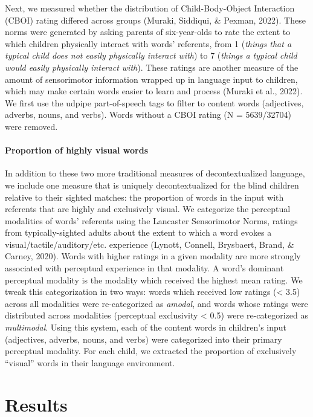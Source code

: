 \documentclass[
  man,floatsintext]{apa6}
\let\oldparagraph\paragraph
\renewcommand{\paragraph}[1]{\oldparagraph{#1}\mbox{}}
\begin{document}
Next, we measured whether the distribution of Child-Body-Object Interaction (CBOI) rating differed across groups (Muraki, Siddiqui, \& Pexman, 2022). These norms were generated by asking parents of six-year-olds to rate the extent to which children physically interact with words' referents, from 1 (\emph{things that a typical child does not easily physically interact with}) to 7 (\emph{things a typical child would easily physically interact with}). These ratings are another measure of the amount of sensorimotor information wrapped up in language input to children, which may make certain words easier to learn and process (Muraki et al., 2022). We first use the udpipe part-of-speech tags to filter to content words (adjectives, adverbs, nouns, and verbs). Words without a CBOI rating (N = 5639/32704) were removed.

\hypertarget{proportion-of-highly-visual-words}{%
\paragraph{Proportion of highly visual words}\label{proportion-of-highly-visual-words}}

In addition to these two more traditional measures of decontextualized language, we include one measure that is uniquely decontextualized for the blind children relative to their sighted matches: the proportion of words in the input with referents that are highly and exclusively visual. We categorize the perceptual modalities of words' referents using the Lancaster Sensorimotor Norms, ratings from typically-sighted adults about the extent to which a word evokes a visual/tactile/auditory/etc. experience (Lynott, Connell, Brysbaert, Brand, \& Carney, 2020). Words with higher ratings in a given modality are more strongly associated with perceptual experience in that modality. A word's dominant perceptual modality is the modality which received the highest mean rating. We tweak this categorization in two ways: words which received low ratings (\textless{} 3.5) across all modalities were re-categorized as \emph{amodal}, and words whose ratings were distributed across modalities (perceptual exclusivity \textless{} 0.5) were re-categorized as \emph{multimodal}. Using this system, each of the content words in children's input (adjectives, adverbs, nouns, and verbs) were categorized into their primary perceptual modality. For each child, we extracted the proportion of exclusively ``visual'' words in their language environment.

\hypertarget{results}{%
\section{Results}\label{results}}
\end{document}
